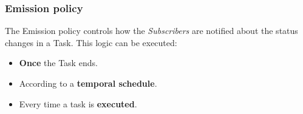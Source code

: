 \subsubsection{Emission policy}
The Emission policy controls how the \emph{Subscribers} are notified about the
status changes in a Task. This logic can be executed:
\begin{itemize}
    \item \textbf{Once} the Task ends.

    \item According to a \textbf{temporal schedule}.

    \item Every time a task is \textbf{executed}.
\end{itemize}
